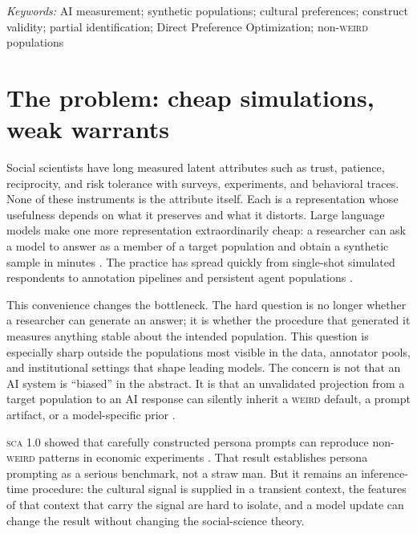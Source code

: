\documentclass[10pt,letterpaper]{article}
\newcommand{\SCA}{\textsc{sca}}
\newcommand{\WEIRD}{\textsc{weird}}
\begin{document}
\noindent\textit{Keywords:} AI measurement; synthetic populations; cultural preferences; construct validity; partial identification; Direct Preference Optimization; non-\WEIRD{} populations

\section{The problem: cheap simulations, weak warrants}
Social scientists have long measured latent attributes such as trust, patience, reciprocity, and risk tolerance with surveys, experiments, and behavioral traces. None of these instruments is the attribute itself. Each is a representation whose usefulness depends on what it preserves and what it distorts. Large language models make one more representation extraordinarily cheap: a researcher can ask a model to answer as a member of a target population and obtain a synthetic sample in minutes \cite{horton2023,argyle2023,aher2023}. The practice has spread quickly from single-shot simulated respondents to annotation pipelines and persistent agent populations \cite{ziems2024,park2024}.

This convenience changes the bottleneck. The hard question is no longer whether a researcher can generate an answer; it is whether the procedure that generated it measures anything stable about the intended population. This question is especially sharp outside the populations most visible in the data, annotator pools, and institutional settings that shape leading models. The concern is not that an AI system is ``biased'' in the abstract. It is that an unvalidated projection from a target population to an AI response can silently inherit a \WEIRD{} default, a prompt artifact, or a model-specific prior \cite{henrich2010,durmus2024}.

\SCA{} 1.0 showed that carefully constructed persona prompts can reproduce non-\WEIRD{} patterns in economic experiments \cite{capra2025}. That result establishes persona prompting as a serious benchmark, not a straw man. But it remains an inference-time procedure: the cultural signal is supplied in a transient context, the features of that context that carry the signal are hard to isolate, and a model update can change the result without changing the social-science theory.
\end{document}
